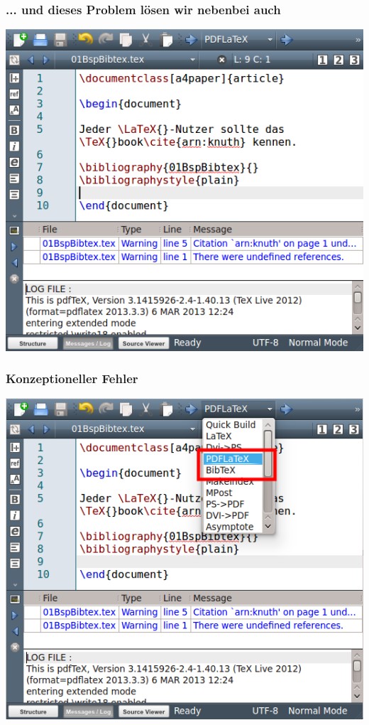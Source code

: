 \documentclass[]{beamer}
\begin{document}
\begin{frame}
\frametitle{... und dieses Problem lösen wir nebenbei auch}

\begin{center}
  \includegraphics[height=.8\paperheight]{pic/FindeDenFehler}
\end{center}

\end{frame}

\begin{frame}
\frametitle{Konzeptioneller Fehler}

\begin{center}
  \includegraphics[height=.8\paperheight]{pic/FehlerImKonzept}
\end{center}

\end{frame}
\end{document}
